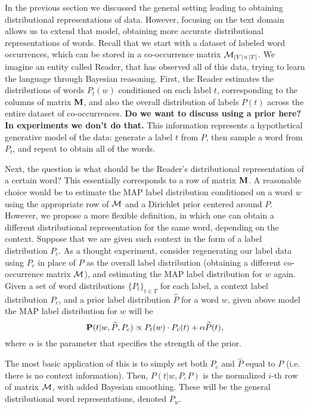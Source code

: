 In the previous section we discussed the general setting leading to
obtaining distributional representations of data. However, focusing on
the text domain allows us to extend that model, obtaining more
accurate distributional representations of words. Recall that we start
with a dataset of labeled word occurrences, which can be stored in a
co-occurrence matrix ${\mathcal M}_{|V|\times|T|}$. 
We imagine an entity
called Reader, that has observed all of this data, trying to learn the
language through Bayesian reasoning. First, the Reader estimates the
distributions of words $P_t(w)$ conditioned on each 
label $t$, corresponding to the columns of matrix $\operatorname{\mathbf{M}}$, and also
the overall distribution of labels $P(t)$ across the entire dataset of 
co-occurrences. 
{\bf Do we want to discuss using a prior here? In experiments we don't
  do that.}
This information represents a hypothetical generative model of the
data: generate a label $t$ from $P$, then sample a word from $P_t$,
and repeat to obtain all of the words. 

Next, the question is what should be  
the Reader's distributional representation of a certain word? This
essentially corresponds to a row of matrix $\operatorname{\mathbf{M}}$. A reasonable choice
would be to estimate the MAP label distribution conditioned on a word
$w$ using the appropriate row of ${\mathcal M}$ and a Dirichlet prior centered
around $P$. However, we propose
a more flexible definition, in which one can obtain a different
distributional representation for the same word, depending on the
context. Suppose that we are given such context in the form of a label
distribution $P_c$. As a thought experiment, consider regenerating our
label data using $P_c$ in place of $P$ as the overall label
distribution (obtaining a different co-occurrence matrix ${\mathcal M}$), and
estimating the MAP label distribution for $w$ again.
\bep
Given a set of word distributions $\{P_t\}_{t\in T}$ for each label, a context label
distribution $P_c$, and a prior label distribution $\widehat{P}$ for a word $w$,
given above model the MAP label distribution for $w$ will be
\[\operatorname{\mathbf{P}}(t|w,\widehat{P},P_c) \propto P_t(w)\cdot P_c(t) + \alpha
\widehat{P}(t),\]
where $\alpha$ is the parameter that specifies the strength of the prior.
\eep

The most basic application of this is to simply set
both $P_c$ and $\widehat{P}$ equal to $P$ (i.e. there is no context
information). Then, $P(t|w,P,P)$ is the
normalized $i$-th row of matrix ${\mathcal M}$, with added Bayesian
smoothing. These will be the general distributional word
representations, denoted $P_w$. 

